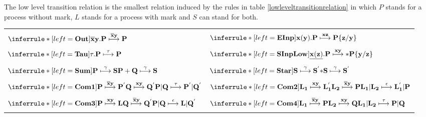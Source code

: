 \begin{definition}
  The low level transition relation is the smallest relation induced by the rules in table \ref{lowleveltransitionrelation} in which $P$ stands for a process without mark, $L$ stands for a process with mark and $S$ can stand for both. 
  \begin{table}
    \begin{tabular}{ll}
	  \hline\\
	  $\inferrule* [left=\bf{Out}]{
	  }{
	    \overline{x}y.P \stackrel{\overline{x}y}{\longmapsto} P
	  }$
	&
	  $\inferrule* [left=\bf{EInp}]{
	  }{
	    x(y).P \stackrel{xz}{\longmapsto} P\{z/y\}
	  }$
      \\\\
	  $\inferrule* [left=\bf{Tau}]{
	  }{
	    \tau.P \stackrel{\tau}{\longmapsto} P
	  }$
	&
	  $\inferrule* [left=\bf{SInpLow}]{
	  }{
	    \underline{x(z)}.P \stackrel{xy}{\longmapsto} * P\{y/z\}
	  }$
      \\\\
	  $\inferrule* [left=\bf{Sum}]{
	    P \stackrel{\gamma}{\longmapsto} S
	  }{
	    P+Q \stackrel{\gamma}{\longmapsto} S
	  }$
	&
	  $\inferrule* [left=\bf{Star}]{
	      S \stackrel{\gamma}{\longmapsto} S^{'}
	  }{
	      *S \stackrel{\gamma}{\longmapsto} S^{'}
	  }$
      \\\\
	  $\inferrule* [left=\bf{Com1}]{
	      P \stackrel{\overline{x}y}{\longmapsto} P^{'}
	    \\
	      Q \stackrel{xy}{\longmapsto} Q^{'}
	  }{
	    P|Q \stackrel{\tau}{\longmapsto} P^{'}|Q^{'}
	  }$
	&
	  $\inferrule* [left=\bf{Com2}]{
	      L_{1} \stackrel{xy}{\longmapsto} L_{1}^{'}
	    \\
	      L_{2} \stackrel{\overline{x}y}{\longmapsto} P
	  }{
	    L_{1}|L_{2} \stackrel{\epsilon}{\longmapsto} L_{1}^{'}|P
	  }$
      \\\\
	  $\inferrule* [left=\bf{Com3}]{
	      P \stackrel{xy}{\longmapsto} L
	    \\
	      Q \stackrel{\overline{x}y}{\longmapsto} Q^{'}
	  }{
	    P|Q \stackrel{\epsilon}{\longmapsto} L|Q^{'}
	  }$
	&
	  $\inferrule* [left=\bf{Com4}]{
	      L_{1} \stackrel{\overline{x}y}{\longmapsto} P
	    \\
	      L_{2} \stackrel{xy}{\longmapsto} Q
	  }{
	    L_{1}|L_{2} \stackrel{\tau}{\longmapsto} P|Q
	  }$
      \\\\

\end{tabular}
\end{table}
\end{definition}
